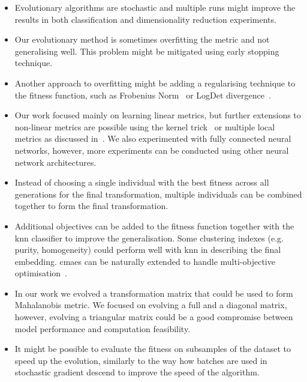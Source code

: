 \documentclass[12pt,a4paper]{report}
\begin{document}
\begin{itemize}
\item Evolutionary algorithms are stochastic and multiple runs might improve the results in both classification and dimensionality reduction experiments.

\item Our evolutionary method is sometimes overfitting the metric and not generalising well. This problem might be mitigated using early stopping technique.

\item Another approach to overfitting might be adding a regularising technique to the fitness function, such as Frobenius Norm~\citep{schultz2003learning} or LogDet divergence~\citep{davis2007information}.

\item Our work focused mainly on learning linear metrics, but further extensions to non-linear metrics are possible using the kernel trick~\citep{chatpatanasiri2010new} or multiple local metrics as discussed in~\citep{bellet2013survey}. We also experimented with fully connected neural networks, however, more experiments can be conducted using other neural network architectures.

\item Instead of choosing a single individual with the best fitness across all generations for the final transformation, multiple individuals can be combined together to form the final transformation.

\item Additional objectives can be added to the fitness function together with the \ac{knn} classifier to improve the generalisation. Some clustering indexes (e.g. purity, homogeneity) could perform well with \ac{knn} in describing the final embedding. \ac{cmaes} can be naturally extended to handle multi-objective optimisation~\citep{igel2007covariance}.

\item In our work we evolved a transformation matrix that could be used to form Mahalanobis metric. We focused on evolving a full and a diagonal matrix, however, evolving a triangular matrix could be a good compromise between model performance and computation feasibility.

\item It might be possible to evaluate the fitness on subsamples of the dataset to speed up the evolution, similarly to the way how batches are used in stochastic gradient descend to improve the speed of the algorithm.
\end{itemize}
\end{document}
